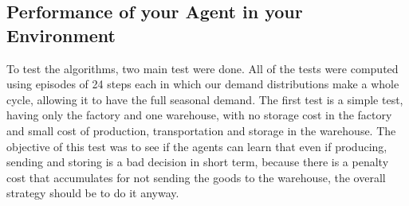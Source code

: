 \documentclass[journal, a4paper]{IEEEtran}
\theoremstyle{plain}
\theoremstyle{definition}
\begin{document}
\subsection{Performance of your Agent in your Environment}
To test the algorithms, two main test were done. All of the tests were computed using episodes of 24 steps each in which our demand distributions make a whole cycle, allowing it to have the full seasonal demand.\newline
The first test is a simple test, having only the factory and one warehouse,  with no storage cost in the factory and small cost of production, transportation and storage in the warehouse. The objective of this test was to see if the agents can learn that even if producing, sending and storing is a bad decision in short term, because there is a penalty cost that accumulates for not sending the goods to the warehouse, the overall strategy should be to do it anyway.
\end{document}
